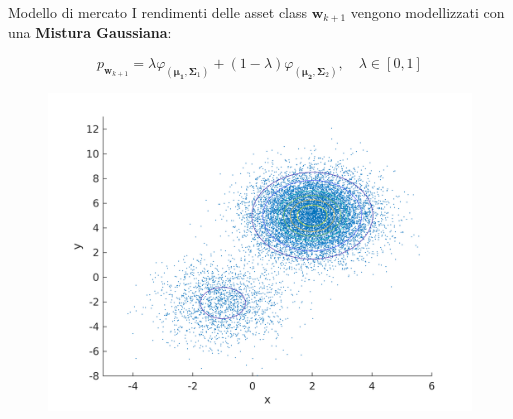 \begin{frame}{Modello di mercato}
	I rendimenti delle asset class $\bm{w}_{k+1}$ vengono modellizzati con una \textbf{Mistura Gaussiana}:
	\begin{block}{}
		\begin{equation*}
		p_{\bm{w}_{k+1}} = \lambda\varphi_{(\bm{\mu_1},\bm{\Sigma}_1)} + (1-\lambda)\varphi_{(\bm{\mu_2},\bm{\Sigma}_2)}, \quad \lambda \in [0,1]
		\end{equation*}
	\end{block}
	\begin{figure}
		\centering
		\includegraphics[width=0.65\linewidth]{Images/Scatter}
	\end{figure}
	
	
\end{frame}	

